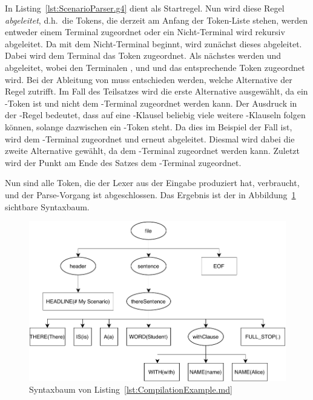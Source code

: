 In Listing~\ref{lst:ScenarioParser.g4} dient  als Startregel.
Nun wird diese Regel \emph{abgeleitet}, d.h.\ die Tokens, die derzeit am Anfang der Token-Liste stehen, werden entweder einem Terminal zugeordnet oder ein Nicht-Terminal wird rekursiv abgeleitet.
Da  mit dem Nicht-Terminal  beginnt, wird zunächst dieses abgeleitet.
Dabei wird dem Terminal  das Token  zugeordnet.
Als nächstes werden  und  abgeleitet, wobei den Terminalen ,  und  und  das entsprechende Token zugeordnet wird.
Bei der Ableitung von  muss entschieden werden, welche Alternative der Regel zutrifft.
Im Fall des Teilsatzes  wird die erste Alternative ausgewählt, da  ein -Token ist und nicht dem -Terminal zugeordnet werden kann.
Der Ausdruck  in der -Regel bedeutet, dass auf eine -Klausel beliebig viele weitere -Klauseln folgen können, solange dazwischen ein -Token steht.
Da dies im Beispiel der Fall ist, wird  dem -Terminal zugeordnet und  erneut abgeleitet.
Diesmal wird dabei die zweite Alternative gewählt, da  dem -Terminal zugeordnet werden kann.
Zuletzt wird der Punkt am Ende des Satzes dem -Terminal zugeordnet.

Nun sind alle Token, die der Lexer aus der Eingabe produziert hat, verbraucht, und der Parse-Vorgang ist abgeschlossen.
Das Ergebnis ist der in Abbildung~\ref{fig:parsetree} sichtbare Syntaxbaum.

\begin{figure}
    \includegraphics[width=\textwidth]{chapter/fulib-scenarios/img/parsetree.pdf}
    \caption{Syntaxbaum von Listing~\ref{lst:CompilationExample.md}}
    \label{fig:parsetree}
\end{figure}

